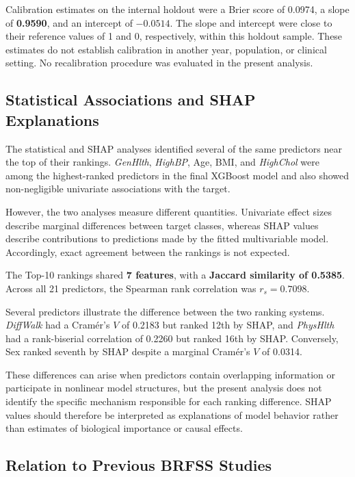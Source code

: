 \documentclass[pdflatex,sn-basic,Numbered]{sn-jnl}
\begin{document}
Calibration estimates on the internal holdout were
a Brier score of 0.0974, a slope of \textbf{0.9590}, and an intercept of
$-0.0514$.
The slope and intercept were close to their reference values of 1 and 0,
respectively, within this holdout sample.
These estimates do not establish calibration in another year, population,
or clinical setting.
No recalibration procedure was evaluated in the present analysis.


\subsection{Statistical Associations and SHAP Explanations}
\label{subsec:shap_discussion}

The statistical and SHAP analyses identified several of the same
predictors near the top of their rankings.
\textit{GenHlth}, \textit{HighBP}, Age, BMI, and \textit{HighChol}
were among the highest-ranked predictors in the final XGBoost model and
also showed non-negligible univariate associations with the target.

However, the two analyses measure different quantities.
Univariate effect sizes describe marginal differences between target
classes, whereas SHAP values describe contributions to predictions made by
the fitted multivariable model.
Accordingly, exact agreement between the rankings is not expected.

The Top-10 rankings shared
\textbf{7 features}, with a
\textbf{Jaccard similarity of 0.5385}.
Across all 21 predictors, the Spearman rank correlation was
\textbf{$r_s=0.7098$}.

Several predictors illustrate the difference between the two ranking
systems.
\textit{DiffWalk} had a Cram{\'e}r's $V$ of 0.2183 but ranked 12th by SHAP,
and \textit{PhysHlth} had a rank-biserial correlation of 0.2260 but ranked
16th by SHAP.
Conversely, Sex ranked seventh by SHAP despite a marginal
Cram{\'e}r's $V$ of 0.0314.

These differences can arise when predictors contain overlapping
information or participate in nonlinear model structures, but the present
analysis does not identify the specific mechanism responsible for each
ranking difference.
SHAP values should therefore be interpreted as explanations of model
behavior rather than estimates of biological importance or causal effects.


\subsection{Relation to Previous BRFSS Studies}
\label{subsec:literature_discussion}
\end{document}
